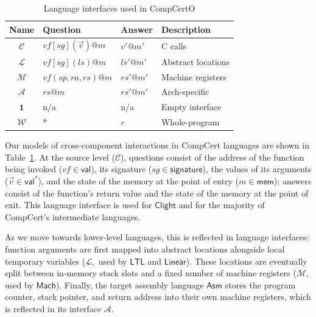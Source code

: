 \documentclass[11pt,oneside]{book}
\theoremstyle{definition}
\newcommand{\kw}[1]{\ensuremath{ \mathsf{#1} }}
\newcommand{\figsize}{}
\begin{document}
\begin{table} %
  \figsize
  \centering
  \begin{tabular}{clll}
    \hline
    Name & Question & Answer & Description \\
    \hline
    $\mathcal{C}$ &
      $\mathit{vf}[\mathit{sg}](\vec{v})@m$ & $v'@m'$ &
      C calls \\
    $\mathcal{L}$ &
      $\mathit{vf}[\mathit{sg}](\mathit{ls})@m$ & $\mathit{ls}'@m'$ &
      Abstract locations \\
    $\mathcal{M}$ &
      $\mathit{vf}(\mathit{sp},\mathit{ra},\mathit{rs})@m$ & $\mathit{rs}'@m'$ &
      Machine registers \\
    $\mathcal{A}$ &
      $\mathit{rs}@m$ & $\mathit{rs}'@m'$ &
      Arch-specific \\
    $\mathbf{1}$ & n/a & n/a &
      Empty interface \\
    $\mathcal{W}$ & * & $r$ &
      Whole-program \\
    \hline
  \end{tabular}
  \caption{Language interfaces used in CompCertO}
  \label{tbl:li}
\end{table}

Our models of cross-component interactions in CompCert languages
are shown in Table~\ref{tbl:li}.
At the source level ($\mathcal{C}$),
questions consist of
the address of the function being invoked
($\mathit{vf} \in \kw{val}$),
its signature
($\mathit{sg} \in \kw{signature}$),
the values of its arguments
($\vec{v} \in \kw{val}^*$),
and the state of the memory at the point of entry
($m \in \kw{mem}$);
answers
consist of the function's return value
and the state of the memory at the point of exit.
This language interface is used for \kw{Clight} and
for the majority of CompCert's intermediate languages.

As we move towards lower-level languages,
this is reflected in language interfaces:
function arguments are first mapped into
abstract locations alongside local temporary variables
($\mathcal{L}$,~used by \kw{LTL} and \kw{Linear}).
These locations are eventually split between
in-memory stack slots and a fixed number of machine registers
($\mathcal{M}$, used by \kw{Mach}).
Finally, the target assembly language \kw{Asm}
stores the program counter, stack pointer,
and return address into their own machine registers,
which is reflected in its interface $\mathcal{A}$.
\end{document}
